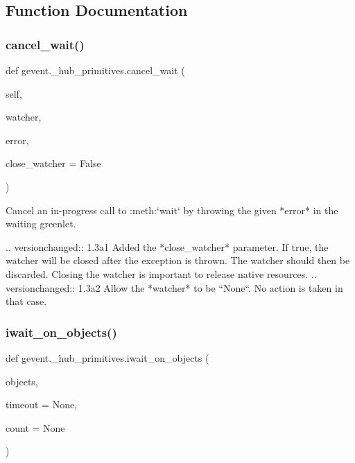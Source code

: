 \subsection{Function Documentation}
\mbox{\label{namespacegevent_1_1__hub__primitives_a770d622e477cf73f6b30dd05850ade67}} 
\subsubsection{\texorpdfstring{cancel\+\_\+wait()}{cancel\_wait()}}
{\footnotesize\ttfamily def gevent.\+\_\+hub\+\_\+primitives.\+cancel\+\_\+wait (\begin{DoxyParamCaption}\item[{}]{self,  }\item[{}]{watcher,  }\item[{}]{error,  }\item[{}]{close\+\_\+watcher = {\ttfamily False} }\end{DoxyParamCaption})}

\begin{DoxyVerb}Cancel an in-progress call to :meth:`wait` by throwing the given *error*
in the waiting greenlet.

.. versionchanged:: 1.3a1
   Added the *close_watcher* parameter. If true, the watcher
   will be closed after the exception is thrown. The watcher should then
   be discarded. Closing the watcher is important to release native resources.
.. versionchanged:: 1.3a2
   Allow the *watcher* to be ``None``. No action is taken in that case.
\end{DoxyVerb}
 \mbox{\label{namespacegevent_1_1__hub__primitives_ae5fd0efa38447d7a7a15f9218ae50c19}} 
\subsubsection{\texorpdfstring{iwait\+\_\+on\+\_\+objects()}{iwait\_on\_objects()}}
{\footnotesize\ttfamily def gevent.\+\_\+hub\+\_\+primitives.\+iwait\+\_\+on\+\_\+objects (\begin{DoxyParamCaption}\item[{}]{objects,  }\item[{}]{timeout = {\ttfamily None},  }\item[{}]{count = {\ttfamily None} }\end{DoxyParamCaption})}

